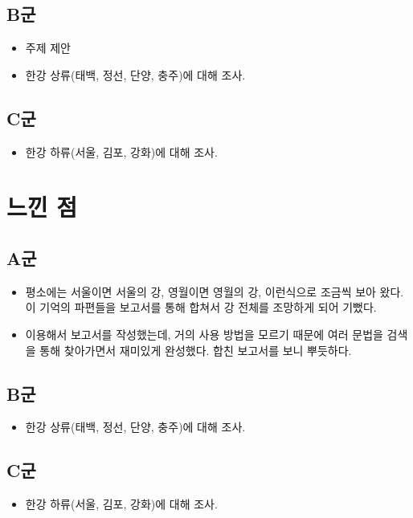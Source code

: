 \documentclass[chapter, oneside]{oblivoir}
\begin{document}
\subsection{B군}
\begin{itemize}
    \item 주제 제안
    \item 한강 상류(태백, 정선, 단양, 충주)에 대해 조사.
\end{itemize}
\subsection{C군}
\begin{itemize}
    \item 한강 하류(서울, 김포, 강화)에 대해 조사.
\end{itemize}

\section{느낀 점}
\subsection{A군}
\begin{itemize}
    \item 평소에는 서울이면 서울의 강, 영월이면 영월의 강, 이런식으로 조금씩 보아 왔다. 이 기억의 파편들을 보고서를 통해 합쳐서 강 전체를 조망하게 되어 기뻤다.
    \item {} 이용해서 보고서를 작성했는데, 거의 사용 방법을 모르기 때문에 여러 문법을 검색을 통해 찾아가면서 재미있게 완성했다. 합친 보고서를 보니 뿌듯하다.
\end{itemize}
\subsection{B군}
\begin{itemize}
    \item 한강 상류(태백, 정선, 단양, 충주)에 대해 조사.
\end{itemize}
\subsection{C군}
\begin{itemize}
    \item 한강 하류(서울, 김포, 강화)에 대해 조사.
\end{itemize}
\end{document}
